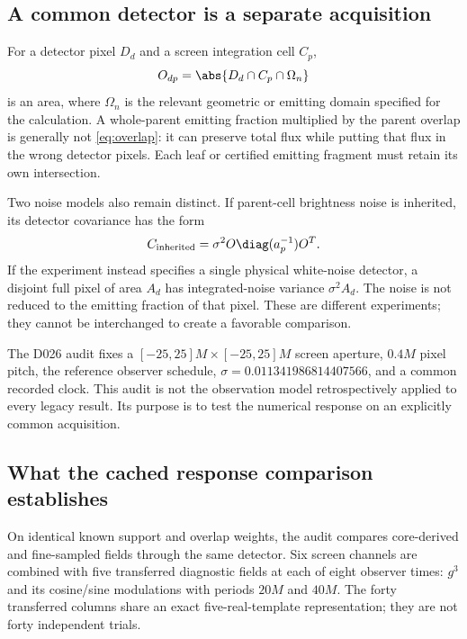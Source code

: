 \subsection{A common detector is a separate acquisition}
For a detector pixel $D_d$ and a screen integration cell $C_p$,
\begin{equation}
O_{dp}=\abs{D_d\cap C_p\cap\Omega_n}
\label{eq:overlap}
\end{equation}
is an area, where $\Omega_n$ is the relevant geometric or emitting domain specified for the calculation. A whole-parent emitting fraction multiplied by the parent overlap is generally not \eqref{eq:overlap}: it can preserve total flux while putting that flux in the wrong detector pixels. Each leaf or certified emitting fragment must retain its own intersection.

Two noise models also remain distinct. If parent-cell brightness noise is inherited, its detector covariance has the form
\begin{equation}
C_{\rm inherited}=\sigma^2 O\diag(a_p^{-1})O^T.
\label{eq:inherited}
\end{equation}
If the experiment instead specifies a single physical white-noise detector, a disjoint full pixel of area $A_d$ has integrated-noise variance $\sigma^2 A_d$. The noise is not reduced to the emitting fraction of that pixel. These are different experiments; they cannot be interchanged to create a favorable comparison.

The D026 audit fixes a $[-25,25]M\times[-25,25]M$ screen aperture, $0.4M$ pixel pitch, the reference observer schedule, $\sigma=0.011341986814407566$, and a common recorded clock. This audit is not the observation model retrospectively applied to every legacy result. Its purpose is to test the numerical response on an explicitly common acquisition.

\subsection{What the cached response comparison establishes}
On identical known support and overlap weights, the audit compares core-derived and fine-sampled fields through the same detector. Six screen channels are combined with five transferred diagnostic fields at each of eight observer times: $g^3$ and its cosine/sine modulations with periods $20M$ and $40M$. The forty transferred columns share an exact five-real-template representation; they are not forty independent trials.

